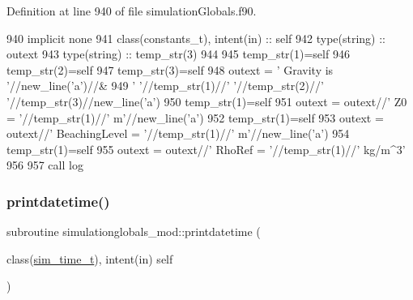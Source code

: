 Definition at line 940 of file simulation\+Globals.\+f90.


\begin{DoxyCode}
940     \textcolor{keywordtype}{implicit none}
941     \textcolor{keywordtype}{class}(constants\_t), \textcolor{keywordtype}{intent(in)} :: self
942     \textcolor{keywordtype}{type}(string) :: outext
943     \textcolor{keywordtype}{type}(string) :: temp\_str(3)
944 
945     temp\_str(1)=self%
946     temp\_str(2)=self%
947     temp\_str(3)=self%
948     outext = \textcolor{stringliteral}{'      Gravity is '}//new\_line(\textcolor{stringliteral}{'a'})//&
949         \textcolor{stringliteral}{'       '}//temp\_str(1)//\textcolor{stringliteral}{' '}//temp\_str(2)//\textcolor{stringliteral}{' '}//temp\_str(3)//new\_line(\textcolor{stringliteral}{'a'})
950     temp\_str(1)=self%
951     outext = outext//\textcolor{stringliteral}{'       Z0 = '}//temp\_str(1)//\textcolor{stringliteral}{' m'}//new\_line(\textcolor{stringliteral}{'a'})
952     temp\_str(1)=self%
953     outext = outext//\textcolor{stringliteral}{'       BeachingLevel = '}//temp\_str(1)//\textcolor{stringliteral}{' m'}//new\_line(\textcolor{stringliteral}{'a'})
954     temp\_str(1)=self%
955     outext = outext//\textcolor{stringliteral}{'       RhoRef = '}//temp\_str(1)//\textcolor{stringliteral}{' kg/m^3'}
956 
957     \textcolor{keyword}{call }log%
\end{DoxyCode}
\mbox{\label{namespacesimulationglobals__mod_abd0e28a5ec7733d0292dd8e631e96577}} 
\subsubsection{\texorpdfstring{printdatetime()}{printdatetime()}}
{\footnotesize\ttfamily subroutine simulationglobals\+\_\+mod\+::printdatetime (\begin{DoxyParamCaption}\item[{class(\mbox{\hyperlink{structsimulationglobals__mod_1_1sim__time__t}{sim\+\_\+time\+\_\+t}}), intent(in)}]{self }\end{DoxyParamCaption})\hspace{0.3cm}{\ttfamily [private]}}



